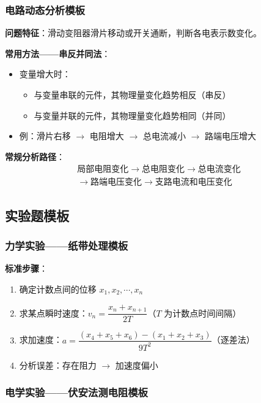 \subsubsection{电路动态分析模板}

\textbf{问题特征}：滑动变阻器滑片移动或开关通断，判断各电表示数变化。

\textbf{常用方法——串反并同法}：
\begin{itemize}
  \item 变量增大时：
    \begin{itemize}
      \item 与变量串联的元件，其物理量变化趋势相反（串反）
      \item 与变量并联的元件，其物理量变化趋势相同（并同）
    \end{itemize}
  \item 例：滑片右移 $\to$ 电阻增大 $\to$ 总电流减小 $\to$ 路端电压增大
\end{itemize}

\textbf{常规分析路径}：
\[
\begin{array}{c}
\text{局部电阻变化} \to \text{总电阻变化} \to \text{总电流变化} \\
\to \text{路端电压变化} \to \text{支路电流和电压变化}
\end{array}
\]

\subsection{实验题模板}

\subsubsection{力学实验——纸带处理模板}

\textbf{标准步骤}：
\begin{enumerate}
  \item 确定计数点间的位移 $x_1,x_2,\cdots,x_n$
  \item 求某点瞬时速度：$v_n = \dfrac{x_n + x_{n+1}}{2T}$（$T$ 为计数点时间间隔）
  \item 求加速度：$a = \dfrac{(x_4+x_5+x_6) - (x_1+x_2+x_3)}{9T^2}$（逐差法）
  \item 分析误差：存在阻力 $\to$ 加速度偏小
\end{enumerate}

\subsubsection{电学实验——伏安法测电阻模板}

